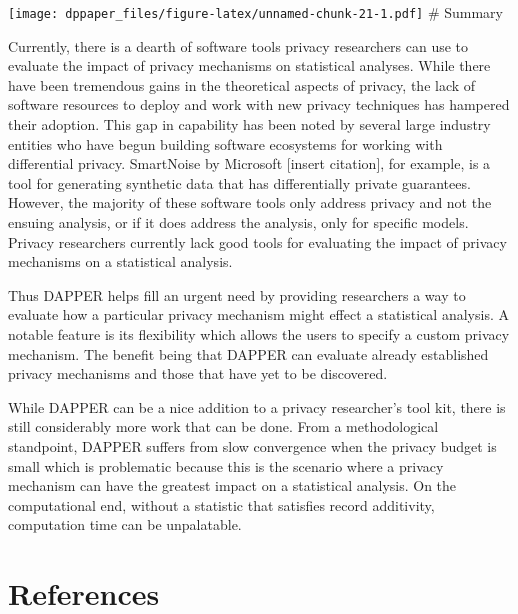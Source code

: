 \texttt{[image: dppaper\_files/figure-latex/unnamed-chunk-21-1.pdf]}
\# Summary

Currently, there is a dearth of software tools privacy researchers can use
to evaluate the impact of privacy mechanisms on statistical analyses.
While there have been tremendous gains in the theoretical aspects of privacy,
the lack of software resources to deploy and work with new privacy techniques has
hampered their adoption. This gap in capability has been noted by several
large industry entities who have begun building software ecosystems for
working with differential privacy. SmartNoise by Microsoft {[}insert citation{]}, for example,
is a tool for generating synthetic data that has differentially private guarantees.
However, the majority of these software tools only address privacy and not the
ensuing analysis, or if it does address the analysis, only for specific models.
Privacy researchers currently lack good tools for evaluating the impact
of privacy mechanisms on a statistical analysis.

Thus DAPPER helps fill an urgent need by providing researchers a way to evaluate
how a particular privacy mechanism might effect a statistical analysis. A notable
feature is its flexibility which allows the users to specify a custom
privacy mechanism. The benefit being that DAPPER can evaluate already
established privacy mechanisms and those that have yet to be discovered.

While DAPPER can be a nice addition to a privacy researcher's tool kit, there
is still considerably more work that can be done. From a methodological standpoint,
DAPPER suffers from slow convergence when the privacy budget is small which is problematic
because this is the scenario where a privacy mechanism can have the greatest impact
on a statistical analysis. On the computational end, without a statistic that satisfies
record additivity, computation time can be unpalatable.

\hypertarget{references}{%
\section*{References}\label{references}}

